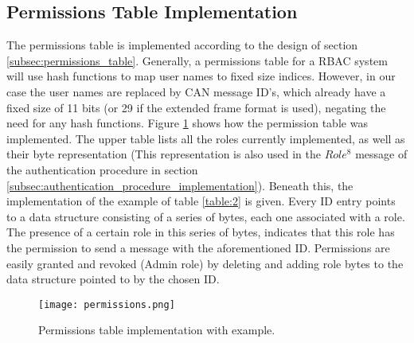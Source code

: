 \subsection{Permissions Table Implementation}
\label{subsec:permissions_table_implementation}

The permissions table is implemented according to the design of section \ref{subsec:permissions_table}. Generally, a permissions table for a RBAC system will use hash functions to map user names to fixed size indices. However, in our case the user names are replaced by CAN message ID's, which already have a fixed size of 11 bits (or 29 if the extended frame format is used), negating the need for any hash functions. Figure \ref{fig:permissions} shows how the permission table was implemented. The upper table lists all the roles currently implemented, as well as their byte representation (This representation is also used in the $Role^{8}$ message of the authentication procedure in section \ref{subsec:authentication_procedure_implementation}). Beneath this, the implementation of the example of table \ref{table:2} is given. Every ID entry points to a data structure consisting of a series of bytes, each one associated with a role. The presence of a certain role in this series of bytes, indicates that this role has the permission to send a message with the aforementioned ID. Permissions are easily granted and revoked (Admin role) by deleting and adding role bytes to the data structure pointed to by the chosen ID. 

\begin{figure}[h]
	\label{fig:permissions}
	\centering
	\texttt{[image: permissions.png]}
	\caption{Permissions table implementation with example.}
\end{figure}